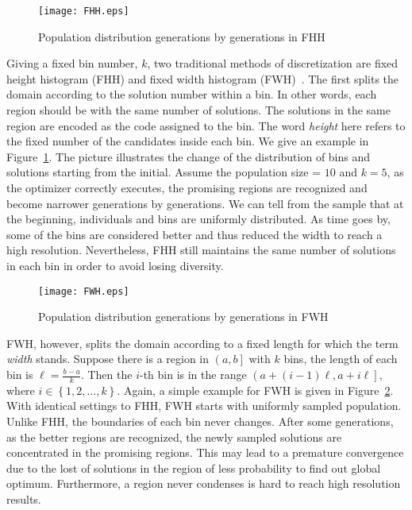 \begin{figure}[h] \begin{center}
    \texttt{[image: FHH.eps]}
    \caption{Population distribution generations by generations in FHH}
    \label{fig:FHH} 
  \end{center} 
\end{figure}

Giving a fixed bin number, $k$, two traditional methods of
discretization are fixed height histogram (FHH) and fixed width
histogram (FWH)~\cite{tsutsui2001evolutionary}.
The first splits the domain according to the solution number within a
bin.
In other words, each region should be with the same number of solutions.
The solutions in the same region are encoded as the code assigned to the
bin.
The word \textit{height} here refers to the fixed number of the
candidates inside each bin.
We give an example in Figure~\ref{fig:FHH}.
The picture illustrates the change of the distribution of bins and
solutions starting from the initial.
Assume the population size = $10$ and $k = 5$, as the optimizer
correctly executes, the promising regions are recognized and become
narrower generations by generations.
We can tell from the sample that at the beginning, individuals and bins
are uniformly distributed.
As time goes by, some of the bins are considered better and thus reduced
the width to reach a high resolution.
Nevertheless, FHH still maintains the same number of solutions in each
bin in order to avoid losing diversity. \\
\begin{figure}[h] \begin{center}
    \texttt{[image: FWH.eps]}
    \caption{Population distribution generations by generations in FWH}
    \label{fig:FWH} 
  \end{center} 
\end{figure}
FWH, however, splits the domain according to a fixed length for which
the term \textit{width} stands.
Suppose there is a region in $\left(a,b\right]$ with $k$ bins, the
length of each bin is $\ell = \frac{b-a}{k}$.
Then the $i$-th bin is in the range $\left(a + (i-1)\ell ,
a+i\ell\right]$, where $i \in \left\{ 1,2,\ldots, k\right\}$.
Again, a simple example for FWH is given in Figure~\ref{fig:FWH}.
With identical settings to FHH, FWH starts with uniformly sampled
population.
Unlike FHH, the boundaries of each bin never changes.
After some generations, as the better regions are recognized, the newly
sampled solutions are concentrated in the promising regions. 
This may lead to a premature convergence due to the lost of solutions in
the region of less probability to find out global optimum.
Furthermore, a region never condenses is hard to reach high resolution
results.

